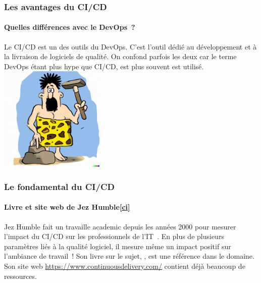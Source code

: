 \documentclass{beamer}
\begin{document}
    \begin{frame}
        \frametitle{Les avantages du CI/CD}
        \framesubtitle{Quelles différences avec le DevOps~?}
        \transdissolve
        Le CI/CD est un des outils du DevOps.
        \bigbreak
        C'est l'outil dédié au développement et à la livraison de logiciels de qualité.
        On confond parfois les deux car le terme DevOps étant plus hype que CI/CD, est plus souvent est utilisé.
        \bigbreak
        \centering
        \includegraphics[width=5cm]{image/caveman-using-a-sophisticated-tool.png}
    \end{frame}

    \begin{frame}
        \frametitle{Le fondamental du CI/CD}
        \framesubtitle{Livre et site web de Jez Humble\cref{ci}}
        \transdissolve
        Jez Humble fait un travaille academic depuis les années 2000 pour mesurer l'impact du CI/CD sur les professionnels de l'IT~.
        \bigbreak
        En plus de plusieurs paramètres liés à la qualité logiciel, il mesure même un impact positif sur l'ambiance de travail~!
        \bigbreak
        Son livre sur le sujet, , est une référence dans le domaine.
        Son site web \url{https://www.continuousdelivery.com/} contient déjà beaucoup de ressources.
    \end{frame}
\end{document}
